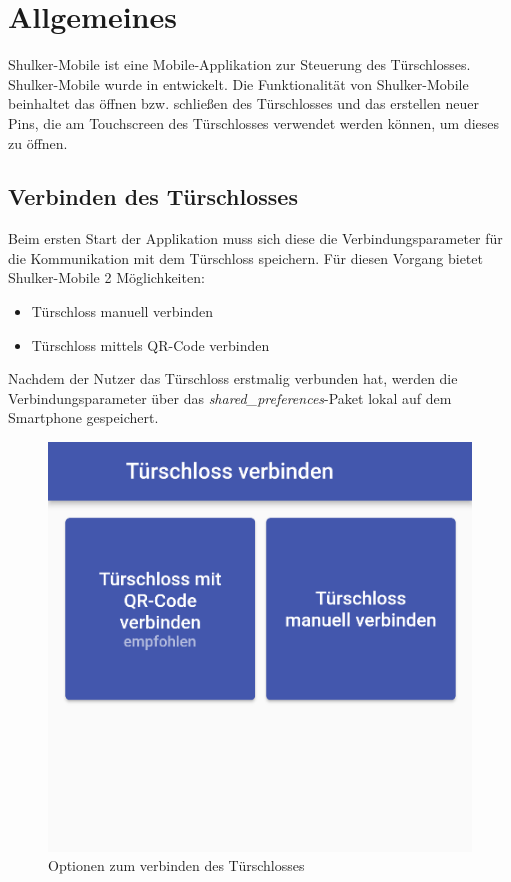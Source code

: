 \chapter{Allgemeines}
Shulker-Mobile ist eine Mobile-Applikation zur Steuerung des Türschlosses.
Shulker-Mobile wurde in  entwickelt.
Die Funktionalität von Shulker-Mobile beinhaltet das öffnen bzw. schließen des Türschlosses und das
erstellen neuer Pins, die am Touchscreen des Türschlosses verwendet werden können, um dieses zu öffnen.

\section{Verbinden des Türschlosses}
Beim ersten Start der Applikation muss sich diese die Verbindungsparameter für die Kommunikation mit dem Türschloss speichern.
Für diesen Vorgang bietet Shulker-Mobile 2 Möglichkeiten:
\begin{itemize}
    \item Türschloss manuell verbinden
    \item Türschloss mittels QR-Code verbinden
\end{itemize}
Nachdem der Nutzer das Türschloss erstmalig verbunden hat, werden die Verbindungsparameter über das 
\textit{shared\_preferences}-Paket lokal auf dem Smartphone gespeichert. 

\begin{figure}[H]
    \begin{center}
        \includegraphics[width=.6\textwidth]{images/mobile/ConnectLockOptions.png}
        \caption{Optionen zum verbinden des Türschlosses}
    \end{center}
\end{figure}

